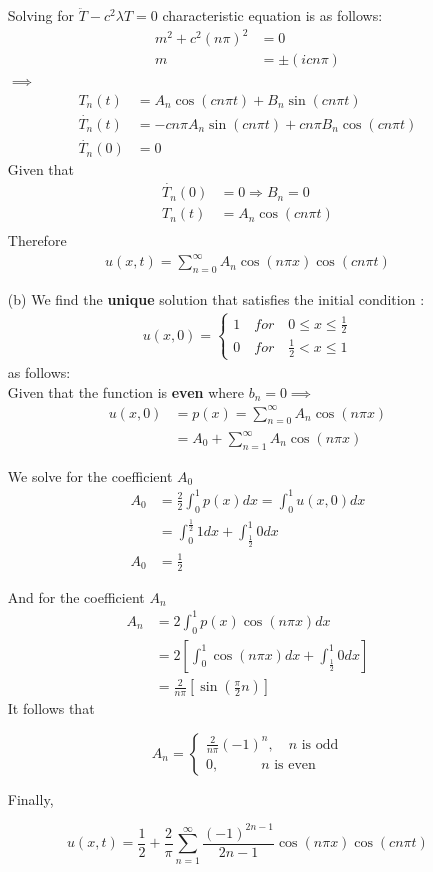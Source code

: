 \documentclass[12pt,a4paper]{article}
\begin{document}
\begin{enumerate}
Solving for $\ddot{T}-  c^2 \lambda T=0$ characteristic equation is as follows:
\begin{align*}
m^2+c^2(n\pi)^2 &=0\\
m&=\pm (icn\pi)
\end{align*}
$\implies$
\begin{align*}
T_n(t) &=A_n\cos(cn\pi t)+B_n\sin(cn\pi t)\\
\dot{T_n}(t) &=-cn\pi A_n\sin(cn\pi t)+cn\pi B_n\cos(cn\pi t)\\
\dot{T_n}(0)  &= 0
\end{align*}
Given that
\begin{align*}
\dot{T_n}(0) &=0\Rightarrow B_n =0\\
T_n(t) &=A_n\cos(cn\pi t)\\
\end{align*}
Therefore
\begin{align*}
u(x,t)=\sum_{n=0}^{\infty}A_n\cos(n\pi x)\cos(cn\pi t)
\end{align*}
\item[(b)] We find the \textbf{unique} solution that satisfies the initial condition	:
\begin{align*}
u(x,0)=\begin{cases}
1 \quad for \quad0\le x\le \frac{1}{2}\\
0 \quad for \quad\frac{1}{2}<x\le1
\end{cases}
\end{align*}
as follows:\\

Given that the function is \textbf{even} where $b_n = 0 \implies $
\begin{align*}
u(x,0) &=p(x)=\sum_{n=0}^{\infty}A_n\cos(n\pi x)\\
&=A_0+\sum_{n=1}^{\infty}A_n\cos(n\pi x)
\end{align*}

We solve for the coefficient $A_0$
\begin{align*}
 A_0 &=\frac{2}{2}\int_{0}^{1}p(x)dx=\int_{0}^{1}u(x,0)dx\\
&=\int_{0}^{\frac{1}{2}}1dx+\int_{\frac{1}{2}}^{1}0dx\\
A_0 &=\frac{1}{2}
\end{align*}

And for the coefficient $A_n$
\begin{align*}
A_n &=2\int_{0}^{1}p(x)\cos(n\pi x)dx\\
&=2\left[\int_{0}^{1}\cos(n\pi x)dx+\int_{\frac{1}{2}}^{1}0dx\right]\\
&=\frac{2}{n\pi} \left[  \sin \left( \frac{\pi}{2}n\right)  \right] 
\end{align*}
It follows that 

\[A_n=\begin{cases}
\frac{2}{n\pi}(-1)^{n},\quad n  \text{ is odd} \\
0, \qquad  \quad n  \text{ is even}
\end{cases}\]

Finally,

\[u(x,t)=\frac{1}{2}+\frac{2}{\pi}\sum_{n=1}^{\infty}\frac{(-1)^{2n-1}}{2n-1}\cos(n\pi x)\cos(cn\pi t)\]
\end{enumerate}
\end{document}
